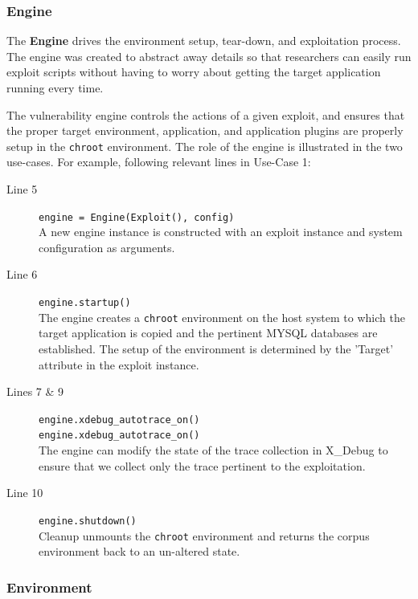 \documentclass[letterpaper,twocolumn,10pt]{article}
\begin{document}
\subsubsection{Engine}
The {\bf Engine} drives the environment setup, tear-down, and exploitation process. The engine was created to abstract away details so that researchers can easily run exploit scripts without having to worry about getting the target application running every time. \par
The vulnerability engine controls the actions of a given exploit, and ensures that the proper target environment, application, and application plugins are properly setup in the {\tt chroot} environment. The role of the engine is illustrated in the two use-cases. For example, following relevant lines in Use-Case 1:
\begin{description}
  \item[Line 5] {\tt \footnotesize    engine = Engine(Exploit(), config)} \\ A new engine instance is constructed with an exploit instance and system configuration as arguments.
  \item[Line 6] {\tt \footnotesize     engine.startup()} \\The engine creates a {\tt chroot} environment on the host system to which the target application is copied and the pertinent MYSQL databases are established. The setup of the environment is determined by the 'Target' attribute in the exploit instance. 
  \item[Lines 7 \& 9] {\tt \footnotesize engine.xdebug\_autotrace\_on()\\ engine.xdebug\_autotrace\_on()}\\The engine can modify the state of the trace collection in X\_Debug to ensure that we collect only the trace pertinent to the exploitation.
  \item[Line 10] {\tt \footnotesize engine.shutdown()}\\Cleanup unmounts the {\tt chroot} environment and returns the corpus environment back to an un-altered state.
\end{description}

\subsubsection{Environment}
\end{document}
